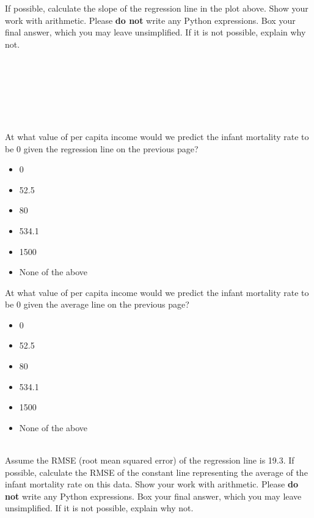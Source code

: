 \begin{enumerate}

 If possible, calculate the slope of the regression line in the plot above. Show your work with arithmetic. Please \textbf{do not} write any Python expressions. Box your final answer, which you may leave unsimplified. If it is not possible, explain why not. 
\\ \\ \\ \\ \\ \\ \\

 At what value of per capita income would we predict the infant mortality rate to be 0 given the regression line on the previous page? 
\begin{itemize}[label=\bubble]
\item 0
\item 52.5
\item 80
\item 534.1
\item 1500
\item None of the above
\end{itemize} 



 At what value of per capita income would we predict the infant mortality rate to be 0 given the average line on the previous page? 
\begin{itemize}[label=\bubble]
\item 0
\item 52.5
\item 80
\item 534.1
\item 1500
\item None of the above
\end{itemize} 
 \\

 Assume the RMSE (root mean squared error) of the regression line is 19.3. If possible, calculate the RMSE of the constant line representing the average of the infant mortality rate on this data. Show your work with arithmetic. Please \textbf{do not} write any Python expressions. Box your final answer, which you may leave unsimplified. If it is not possible, explain why not. \\ \\ \\ \\ \\ \\ \\


\end{enumerate}
